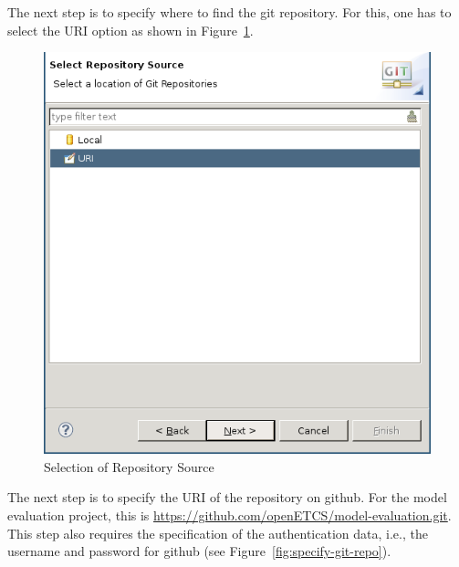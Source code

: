 \documentclass[10pt,a4paper]{article}
\newcommand{\skalierung}{.6}
\begin{document}
The next step is to specify where to find the git repository. For this, one has
to select the URI option as shown in Figure~\ref{fig:select-repo-source}.

\begin{figure}[H]
  \centering
  \includegraphics[width=\skalierung\textwidth]{project_import_step2}
  \caption{Selection of Repository Source}
  \label{fig:select-repo-source}
\end{figure}

The next step is to specify the URI of the repository on github. For the
model evaluation project, this is
\url{https://github.com/openETCS/model-evaluation.git}. This step also requires
the specification of the authentication data, i.e., the username and password
for github (see Figure~\ref{fig:specify-git-repo}).
\end{document}
